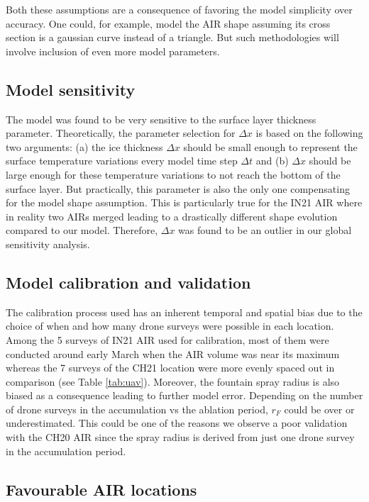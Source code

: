 \documentclass[utf8]{frontiersSCNS}
\begin{document}
Both these assumptions are a consequence of favoring the model simplicity over accuracy. One could, for example,
model the AIR shape assuming its cross section is a gaussian curve instead of a triangle.  But such
methodologies will involve inclusion of even more model parameters.

\subsection{Model sensitivity}

The model was found to be very sensitive to the surface layer thickness parameter. Theoretically, the parameter
selection for $\Delta x$ is based on the following two arguments: (a) the ice thickness $\Delta x$ should be
small enough to represent the surface temperature variations every model time step $\Delta t$ and (b) $\Delta x$
should be large enough for these temperature variations to not reach the bottom of the surface layer. But
practically, this parameter is also the only one compensating for the model shape assumption. This is
particularly true for the IN21 AIR where in reality two AIRs merged leading to a drastically different shape
evolution compared to our model. Therefore, $\Delta x$ was found to be an outlier in our global sensitivity
analysis. 

\subsection{Model calibration and validation}

The calibration process used has an inherent temporal and spatial bias due to the choice of when and how many
drone surveys were possible in each location. Among the 5 surveys of IN21 AIR used for calibration, most of them
were conducted around early March when the AIR volume was near its maximum whereas the 7 surveys of the CH21
location were more evenly spaced out in comparison (see Table \ref{tab:uav}). Moreover, the fountain spray
radius is also biased as a consequence leading to further model error. Depending on the number of drone surveys
in the accumulation vs the ablation period, $r_F$ could be over or underestimated. This could be one of the
reasons we observe a poor validation with the CH20 AIR since the spray radius is derived from just one drone
survey in the accumulation period.

\subsection{Favourable AIR locations}
\end{document}
